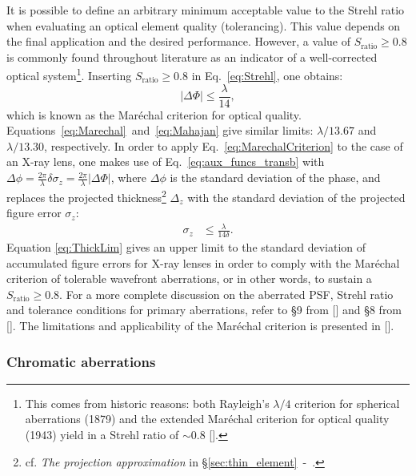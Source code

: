 \begin{refsection}
It is possible to define an arbitrary minimum acceptable value to the Strehl ratio when evaluating an optical element quality (tolerancing). This value depends on the final application and the desired performance. However, a value of $S_\text{ratio}\geq0.8$ is commonly found throughout literature as an indicator of a well-corrected optical system\footnote{This comes from historic reasons: both Rayleigh's $\lambda/4$ criterion for spherical aberrations (1879) and the extended Mar\'echal criterion for optical quality (1943) yield in a Strehl ratio of $\sim0.8$ [\cite{born_wolf1999}].}. Inserting $S_\text{ratio}\geq0.8$ in Eq.~\ref{eq:Strehl}, one obtains:
\begin{equation}\label{eq:MarechalCriterion}
    |\Delta\Phi|\leq\frac{\lambda}{14},
\end{equation}{}
which is known as the Mar\'echal criterion for optical quality. Equations~\ref{eq:Marechal}~and~\ref{eq:Mahajan} give similar limits: $\lambda/13.67$ and $\lambda/13.30$, respectively. In order to apply  Eq.~\ref{eq:MarechalCriterion} to the case of an X-ray lens, one makes use of Eq.~\ref{eq:aux_funcs_transb} with $\Delta\phi =\frac{2\pi}{\lambda}\delta\sigma_z=\frac{2\pi}{\lambda}|\Delta\Phi|$, where $\Delta\phi$ is the  standard deviation of the phase, and replaces the projected thickness\footnote{cf. \textit{The projection approximation} in \S\ref{sec:thin_element}~-~\textit{}.} $\Delta_z$ with the standard deviation of the projected figure error $\sigma_z$:
\begin{align}\label{eq:ThickLim}
    \sigma_z &\leq \frac{\lambda}{14\delta}.
\end{align}{}
Equation \ref{eq:ThickLim} gives an upper limit to the standard deviation of accumulated figure errors for X-ray lenses in order to comply with the Mar\'echal criterion of tolerable wavefront aberrations, or in other words, to sustain a $S_\text{ratio}\geq0.8$. For a more complete discussion on the aberrated PSF, Strehl ratio and tolerance conditions for primary aberrations, refer to \S9 from [\cite{born_wolf1999}] and \S8 from [\cite{Mahajan2011}]. The limitations and applicability of the Maréchal criterion is presented in [\cite{Ross2009}].

\subsubsection*{Chromatic aberrations}


\end{refsection}
